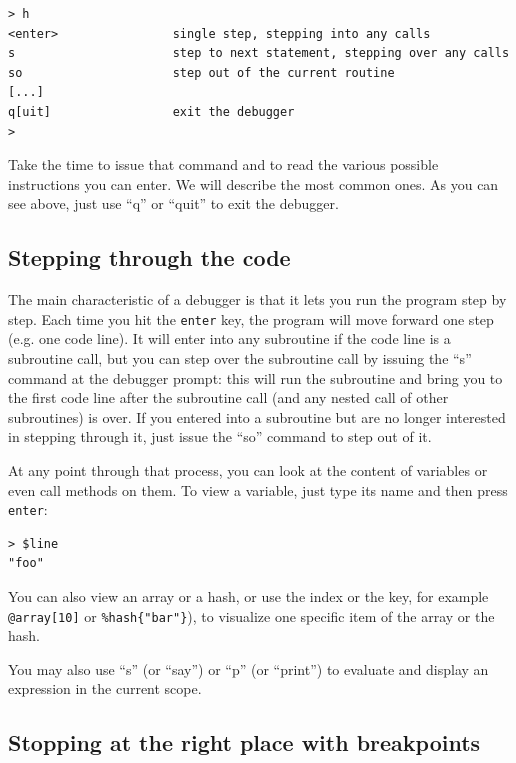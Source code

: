 \begin{verbatim}
> h
<enter>                single step, stepping into any calls
s                      step to next statement, stepping over any calls
so                     step out of the current routine
[...]
q[uit]                 exit the debugger
>
\end{verbatim}

Take the time to issue that command and to read the 
various possible instructions you can enter. We will 
describe the most common ones. As you can see 
above, just use ``q'' or ``quit'' to exit the debugger.

\subsection{Stepping through the code}


The main characteristic of a debugger is that it 
lets you run the program step 
by step. Each time you hit the {\tt enter} key, the 
program will move forward one step (e.g. one code line). 
It will enter into any subroutine if the code line 
is a subroutine call, but you can step over the 
subroutine call by issuing the ``s'' 
command at the debugger prompt: this will run the subroutine 
and bring you to the first code line after the subroutine 
call (and any nested call of other subroutines) is over.
If you entered into a subroutine but are no longer 
interested in stepping through it, just issue the ``so'' 
command to step out of it.

At any point through that process, you can look at the 
content of variables or even call methods on them. To 
view a variable, just type its name and then press 
{\tt enter}:

\begin{verbatim}
> $line
"foo"
\end{verbatim}

You can also view an array or a hash, or use the index 
or the key, for example \verb'@array[10]' or 
\verb'%hash{"bar"}'), to visualize one specific item of 
the array or the hash.

You may also use ``s'' (or ``say'') or ``p'' (or ``print'') 
to evaluate and display an expression in the current scope.

\subsection{Stopping at the right place with breakpoints}

